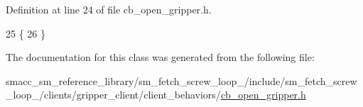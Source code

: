 Definition at line 24 of file cb\+\_\+open\+\_\+gripper.\+h.


\begin{DoxyCode}
25     \{
26     \}
\end{DoxyCode}


The documentation for this class was generated from the following file\+:\begin{DoxyCompactItemize}
\item 
smacc\+\_\+sm\+\_\+reference\+\_\+library/sm\+\_\+fetch\+\_\+screw\+\_\+loop\+\_/include/sm\+\_\+fetch\+\_\+screw\+\_\+loop\+\_/clients/gripper\+\_\+client/client\+\_\+behaviors/\hyperlink{sm__fetch__screw__loop__1_2include_2sm__fetch__screw__loop__1_2clients_2gripper__client_2client_eb4e1bb08aa4b22a82079259461b675d}{cb\+\_\+open\+\_\+gripper.\+h}\end{DoxyCompactItemize}
